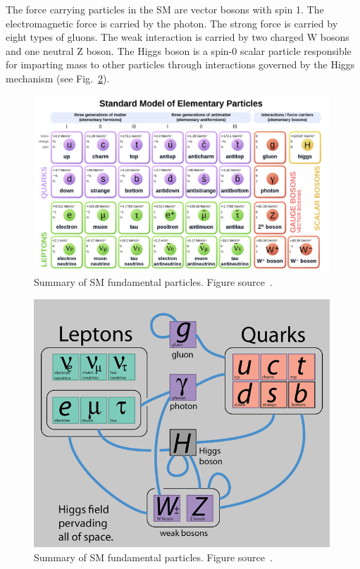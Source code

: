 The force carrying particles in the SM are vector bosons with spin 1. The electromagnetic force is carried by the photon. The strong force is carried by eight types of gluons. The weak interaction is carried by two charged W bosons and one neutral Z boson.
The Higgs boson is a spin-0 scalar particle responsible for imparting mass to other particles through interactions governed by the Higgs mechanism (see Fig.~\ref{fig:SMinteractions}).



\begin{figure}[t!]
\centering
\includegraphics[width=0.99\textwidth]{figures/SM_include_antimatter.png}
\caption[Summary of standard model fundamental particles]{Summary of SM fundamental particles. Figure source~\cite{SMtable}.
\label{fig:SMParticles}}
\end{figure}

\begin{figure}[t!]
\centering
\includegraphics[width=0.99\textwidth]{figures/interactions_SM.png}
\caption[Summary of standard model fundamental particles]{Summary of SM fundamental particles. Figure source~\cite{SMintera}.
\label{fig:SMinteractions}}
\end{figure}
